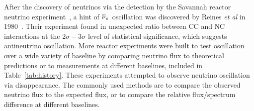     After the discovery of neutrinos via the detection by the Savannah reactor neutrino experiment~\cite{bib:CowanReines}, a hint of $\overline{\nu }_{e}\hspace{1pt}$ oscillation was discovered by Reines \textit{et al} in 1980~\cite{bib:reines1980}.
    Their experiment found in unexpected ratio between CC and NC interactions at the $2\sigma-3\sigma$ level of statistical significance, which suggests antineutrino oscillation.
    More reactor experiments were built to test \nuebar oscillation over a wide variety of baseline by comparing neutrino flux to theoretical predictions or to measurements at different baselines, included in Table~\ref{tab:history}.
    These experiments attempted to observe neutrino oscillation via \nuebar  disappearance.
    The commonly used methods are to compare the observed neutrino flux to the expected flux, or to compare the relative flux/spectrum difference at different baselines.
